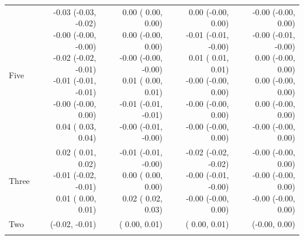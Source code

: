 \documentclass[12pt,PhD,twoside,openright]{muthesis}
\begin{document}
\begin{table}[!h]
\begin{tabular}[t]{l>{\ttfamily}r>{\ttfamily}r>{\ttfamily}r>{\ttfamily}r}
\hspace{1em}Five & \makecell[l]{-0.03 (-0.03, -0.02)\\ -0.00 (-0.00, -0.00)\\ -0.02 (-0.02, -0.01)\\ -0.01 (-0.01, -0.01)\\ -0.00 (-0.00,  0.00)\\  0.04 ( 0.03,  0.04)} & \makecell[l]{0.00 ( 0.00,  0.00)\\  0.00 (-0.00,  0.00)\\ -0.00 (-0.00, -0.00)\\  0.01 ( 0.00,  0.01)\\ -0.01 (-0.01, -0.01)\\ -0.00 (-0.01, -0.00)} & \makecell[l]{0.00 (-0.00,  0.00)\\ -0.01 (-0.01, -0.00)\\  0.01 ( 0.01,  0.01)\\ -0.00 (-0.00,  0.00)\\ -0.00 (-0.00,  0.00)\\ -0.00 (-0.00,  0.00)} & \makecell[l]{-0.00 (-0.00,  0.00)\\ -0.00 (-0.01, -0.00)\\  0.00 (-0.00,  0.00)\\  0.00 (-0.00,  0.00)\\  0.00 (-0.00,  0.00)\\ -0.00 (-0.00,  0.00)}\\
\hspace{1em}Three & \makecell[l]{0.02 ( 0.01,  0.02)\\ -0.01 (-0.02, -0.01)\\  0.01 ( 0.00,  0.01)} & \makecell[l]{-0.01 (-0.01, -0.00)\\  0.00 ( 0.00,  0.00)\\  0.02 ( 0.02,  0.03)} & \makecell[l]{-0.02 (-0.02, -0.02)\\ -0.00 (-0.01, -0.00)\\ -0.00 (-0.00,  0.00)} & \makecell[l]{-0.00 (-0.00,  0.00)\\ -0.00 (-0.00,  0.00)\\ -0.00 (-0.00,  0.00)}\\
\rowcolor{gray!6}  \hspace{1em}Two & -0.02 (-0.02, -0.01) & 0.00 ( 0.00,  0.01) & 0.01 ( 0.00,  0.01) & -0.00 (-0.00,  0.00)\\
\addlinespace[0.3em]
\multicolumn{5}{l}{\textbf{Slope}}\\

\end{tabular}
\end{table}
\end{document}
